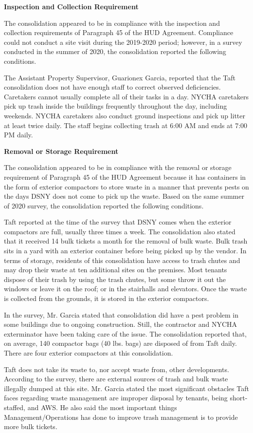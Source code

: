  

\textbf{Inspection and Collection Requirement} 

 

The consolidation appeared to be in compliance with the inspection and collection requirements of Paragraph 45 of the HUD Agreement. Compliance could not conduct a site visit during the 2019-2020 period; however, in a survey conducted in the summer of 2020, the consolidation reported the following conditions.

The Assistant Property Supervisor, Guarionex Garcia, reported that the Taft consolidation does not have enough staff to correct observed deficiencies. Caretakers cannot usually complete all of their tasks in a day. NYCHA caretakers pick up trash inside the buildings frequently throughout the day, including weekends. NYCHA caretakers also conduct ground inspections and pick up litter at least twice daily. The staff begins collecting trash at 6:00 AM and ends at 7:00 PM daily.

\textbf{Removal or Storage Requirement} 

The consolidation appeared to be in compliance with the removal or storage requirement of Paragraph  45 of the HUD Agreement because it has containers in the form of exterior compactors to store waste in a manner that prevents pests on the days DSNY does not come to pick up the waste. Based on the same summer of  2020  survey, the consolidation reported the following conditions.

 

Taft reported at the time of the survey that DSNY comes when the exterior compactors are full, usually three times a week. The consolidation also stated that it received 14 bulk tickets a month for the removal of bulk waste. Bulk trash sits in a yard with an exterior container before being picked up by the vendor. In terms of storage, residents of this consolidation have access to trash chutes and may drop their waste at ten additional sites on the premises.  Most tenants dispose of their trash by using the trash chutes, but some throw it out the windows or leave it on the roof; or in the stairhalls and elevators. Once the waste is collected from the grounds, it is stored in the exterior compactors.

 

In the survey, Mr. Garcia stated that consolidation did have a pest problem in some buildings due to ongoing construction. Still, the contractor and NYCHA exterminator have been taking care of the issue. The consolidation reported that, on average, 140 compactor bags (40 lbs. bags)  are disposed of from Taft daily. There are four exterior compactors at this consolidation.

Taft does not take its waste to, nor accept waste from, other developments. According to the survey, there are external sources of trash and bulk waste illegally dumped at this site. Mr. Garcia stated the most significant obstacles Taft faces regarding waste management are improper disposal by tenants, being short-staffed, and AWS.  He also said the most important things Management/Operations has done to improve trash management is to provide more bulk tickets.

 